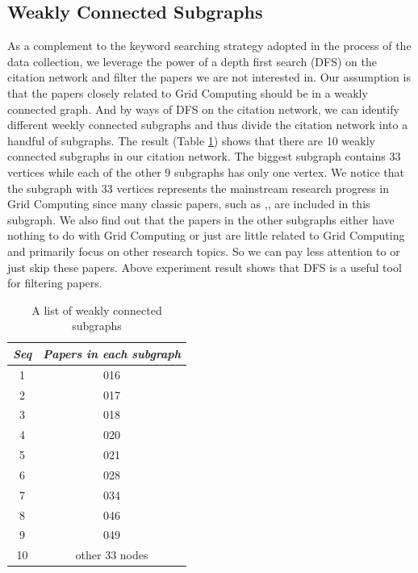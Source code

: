 \subsection{Weakly Connected Subgraphs}
As a complement to the keyword searching strategy adopted in the process of the data collection, we leverage the power of a depth first search (DFS) on the citation network and filter the papers we are not interested in.  Our assumption is that the papers closely related to Grid Computing should be in a weakly connected graph. And by ways of DFS on the citation network, we can identify different weekly connected subgraphs and thus divide the citation network into a handful of subgraphs. The result (Table \ref{T:subgraph}) shows that there are 10 weakly connected subgraphs in our citation network. The biggest subgraph contains 33 vertices while each of the other 9 subgraphs has only one vertex. We notice that the subgraph with 33 vertices represents the mainstream research progress in Grid Computing since many classic papers, such as \cite{Foster01theanatomy},\cite{foster2004grid},\cite{Foster02thephysiology} are included in this subgraph. We also find out that  the papers in the other subgraphs either have nothing to do with Grid Computing or just are little related to Grid Computing and primarily focus on other research topics. So we can pay less attention to or just skip these papers. Above experiment result shows that DFS is a useful tool for filtering papers. 

\begin{table}[htb]
\begin{center}
\begin {tabular} {|c|c|}
\hline
{\em \bf Seq} & {\em \bf Papers in each subgraph}\\
\hline
\hline
1&016\\
\hline
2&017\\
\hline
3&018\\
\hline
4&020\\
\hline
5&021\\
\hline
6&028\\
\hline
7&034\\
\hline
8&046\\
\hline
9&049\\
\hline
10&other 33 nodes\\
\hline
\end {tabular}
\caption{ A list of weakly connected subgraphs}
\label {T:subgraph}
\end{center}
\end {table}

